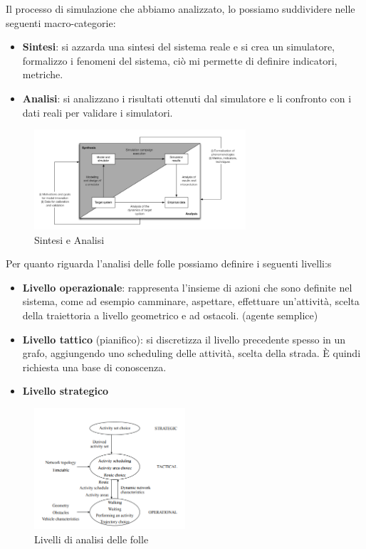 Il processo di simulazione che abbiamo analizzato, lo possiamo suddividere nelle
seguenti macro-categorie:
\begin{itemize}
      \item \textbf{Sintesi}: si azzarda una sintesi del sistema reale e si crea
            un simulatore, formalizzo i fenomeni del sistema, ciò mi permette di
            definire indicatori, metriche.
      \item \textbf{Analisi}: si analizzano i risultati ottenuti dal simulatore e
            li confronto con i dati reali per validare i simulatori.
\end{itemize}
\begin{figure}[!ht]
      \centering
      \includegraphics[width=0.7\textwidth]{./img/sim/lifecycle.png}
      \caption{Sintesi e Analisi}
      \label{fig:sintesi_analisi}
\end{figure}

Per quanto riguarda l'analisi delle folle possiamo definire i seguenti livelli:s
\begin{itemize}
      \item \textbf{Livello operazionale}: rappresenta l'insieme di azioni che
            sono definite nel sistema, come ad esempio camminare, aspettare,
            effettuare un'attività, scelta della traiettoria a livello geometrico
            e ad ostacoli. (agente semplice)
      \item \textbf{Livello tattico} (pianifico): si discretizza il livello
            precedente spesso in un grafo, aggiungendo uno scheduling delle
            attività, scelta della strada. È quindi richiesta una base di
            conoscenza.
      \item \textbf{Livello strategico}
\end{itemize}
\begin{figure}[!ht]
      \centering
      \includegraphics[width=0.5\textwidth]{./img/sim/levelsAnalysis.png}
      \caption{Livelli di analisi delle folle}
      \label{fig:livelli_folle}
\end{figure}

